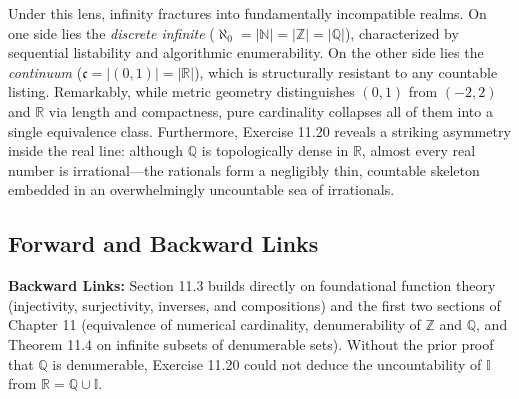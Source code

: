 \documentclass[11pt, letterpaper]{article}
\theoremstyle{definition}
\theoremstyle{remark}
\begin{document}
Under this lens, infinity fractures into fundamentally incompatible realms. On one side lies the \emph{discrete infinite} ($\aleph_0 = |\mathbb{N}| = |\mathbb{Z}| = |\mathbb{Q}|$), characterized by sequential listability and algorithmic enumerability. On the other side lies the \emph{continuum} ($\mathfrak{c} = |(0, 1)| = |\mathbb{R}|$), which is structurally resistant to any countable listing. Remarkably, while metric geometry distinguishes $(0, 1)$ from $(-2, 2)$ and $\mathbb{R}$ via length and compactness, pure cardinality collapses all of them into a single equivalence class. Furthermore, Exercise 11.20 reveals a striking asymmetry inside the real line: although $\mathbb{Q}$ is topologically dense in $\mathbb{R}$, almost every real number is irrational—the rationals form a negligibly thin, countable skeleton embedded in an overwhelmingly uncountable sea of irrationals.

\subsection{Forward and Backward Links}

\textbf{Backward Links:} Section 11.3 builds directly on foundational function theory (injectivity, surjectivity, inverses, and compositions) and the first two sections of Chapter 11 (equivalence of numerical cardinality, denumerability of $\mathbb{Z}$ and $\mathbb{Q}$, and Theorem 11.4 on infinite subsets of denumerable sets). Without the prior proof that $\mathbb{Q}$ is denumerable, Exercise 11.20 could not deduce the uncountability of $\mathbb{I}$ from $\mathbb{R} = \mathbb{Q} \cup \mathbb{I}$.
\end{document}
